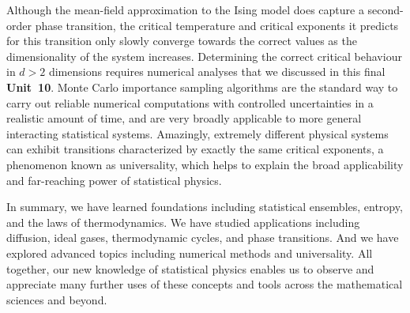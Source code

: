 Although the mean-field approximation to the Ising model does capture a second-order phase transition, the critical temperature and critical exponents it predicts for this transition only slowly converge towards the correct values as the dimensionality of the system increases.
Determining the correct critical behaviour in $d > 2$ dimensions requires numerical analyses that we discussed in this final \textbf{Unit~10}.
Monte Carlo importance sampling algorithms are the standard way to carry out reliable numerical computations with controlled uncertainties in a realistic amount of time, and are very broadly applicable to more general interacting statistical systems.
Amazingly, extremely different physical systems can exhibit transitions characterized by exactly the same critical exponents, a phenomenon known as universality, which helps to explain the broad applicability and far-reaching power of statistical physics.

In summary, we have learned foundations including statistical ensembles, entropy, and the laws of thermodynamics.
We have studied applications including diffusion, ideal gases, thermodynamic cycles, and phase transitions.
And we have explored advanced topics including numerical methods and universality.
All together, our new knowledge of statistical physics enables us to observe and appreciate many further uses of these concepts and tools across the mathematical sciences and beyond.
